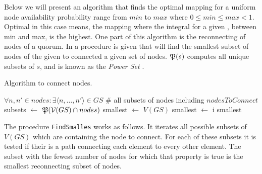 \documentclass[conference]{IEEEtran}
\begin{document}
Below we will present an algorithm that finds the optimal mapping for a
uniform node availability probability range from \(min\) to \(max\) where \(0
\le min \le max < 1\).
Optimal in this case means, the mapping where the integral for a given ,
between min and max, is the highest.
One part of this algorithm is the reconnecting of nodes of a quorum.
In  a procedure is given that will find the smallest
subset of nodes of the given  to connected a given set of nodes.
\(\frak{P}(s)\) computes all unique subsets of \(s\), and is known as the
\emph{Power Set} \cite{devlin1979fundamentalsset}.
\begin{algorithm}[h]
\caption{Algorithm to connect nodes.}
\label{alg:connectnodes}
\begin{algorithmic}[1]
	\State
	\Return \(\forall n,n' \in nodes : \exists \langle n, \dots, n' \rangle \in GS\)
\EndProcedure
\State
{}
	\State \# all subsets of nodes including $nodesToConnect$
	\State subsets $\leftarrow$ $\frak{P}(\mathcal{V}(GS) \cap nodes)$
	\State smallest $\leftarrow$ $V(GS)$
			\State smallest $\leftarrow$ i
		\EndIf
	\EndFor
	\State
	\Return smallest
\EndProcedure
\end{algorithmic}
\end{algorithm}
The procedure \texttt{FindSmalles} works as follows.
It iterates all possible subsets of \(V(GS)\) which are containing the node to
connect.
For each of these subsets it is tested if their is a path connecting each
element to every other element.
The subset with the fewest number of nodes for which that property is true is
the smallest reconnecting subset of nodes.
\end{document}
